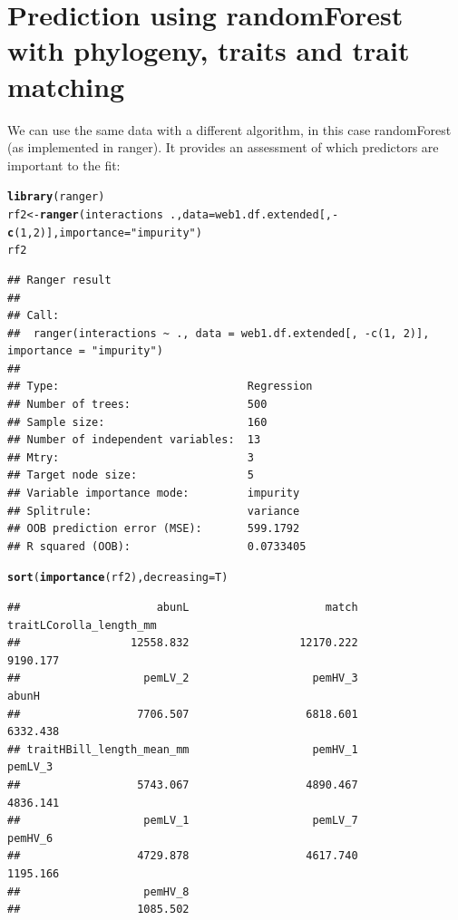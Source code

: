 \documentclass[a4paper, 11pt]{article}\usepackage[]{graphicx}\usepackage[]{color}
\makeatletter
\newcommand{\hlnum}[1]{\textcolor[rgb]{0.686,0.059,0.569}{#1}}%
\newcommand{\hlstr}[1]{\textcolor[rgb]{0.192,0.494,0.8}{#1}}%
\newcommand{\hlopt}[1]{\textcolor[rgb]{0,0,0}{#1}}%
\newcommand{\hlstd}[1]{\textcolor[rgb]{0.345,0.345,0.345}{#1}}%
\newcommand{\hlkwb}[1]{\textcolor[rgb]{0.69,0.353,0.396}{#1}}%
\newcommand{\hlkwc}[1]{\textcolor[rgb]{0.333,0.667,0.333}{#1}}%
\newcommand{\hlkwd}[1]{\textcolor[rgb]{0.737,0.353,0.396}{\textbf{#1}}}%
\newenvironment{kframe}{%
 \def\at@end@of@kframe{}%
 \ifinner\ifhmode%
  \def\at@end@of@kframe{\end{minipage}}%
  \begin{minipage}{\columnwidth}%
 \fi\fi%
 \def\FrameCommand##1{\hskip\@totalleftmargin \hskip-\fboxsep
 \colorbox{shadecolor}{##1}\hskip-\fboxsep
     \hskip-\linewidth \hskip-\@totalleftmargin \hskip\columnwidth}%
 \MakeFramed {\advance\hsize-\width
   \@totalleftmargin\z@ \linewidth\hsize
   \@setminipage}}%
 {\par\unskip\endMakeFramed%
 \at@end@of@kframe}
\newenvironment{knitrout}{}{} %
\makeatother
\begin{document}
\section{Prediction using randomForest with phylogeny, traits and trait matching}
We can use the same data with a different algorithm, in this case randomForest (as implemented in ranger). It provides an assessment of which predictors are important to the fit:
\begin{knitrout}\small
{}\color{fgcolor}\begin{kframe}
\begin{alltt}
\hlkwd{library}\hlstd{(ranger)}
\hlstd{rf2} \hlkwb{<-} \hlkwd{ranger}\hlstd{(interactions} \hlopt{~} \hlstd{.,} \hlkwc{data}\hlstd{=web1.df.extended[,} \hlopt{-}\hlkwd{c}\hlstd{(}\hlnum{1}\hlstd{,} \hlnum{2}\hlstd{)],} \hlkwc{importance}\hlstd{=}\hlstr{"impurity"}\hlstd{)}
\hlstd{rf2}
\end{alltt}
\begin{verbatim}
## Ranger result
## 
## Call:
##  ranger(interactions ~ ., data = web1.df.extended[, -c(1, 2)],      importance = "impurity") 
## 
## Type:                             Regression 
## Number of trees:                  500 
## Sample size:                      160 
## Number of independent variables:  13 
## Mtry:                             3 
## Target node size:                 5 
## Variable importance mode:         impurity 
## Splitrule:                        variance 
## OOB prediction error (MSE):       599.1792 
## R squared (OOB):                  0.0733405
\end{verbatim}
\begin{alltt}
\hlkwd{sort}\hlstd{(}\hlkwd{importance}\hlstd{(rf2),} \hlkwc{decreasing}\hlstd{=T)}
\end{alltt}
\begin{verbatim}
##                     abunL                     match   traitLCorolla_length_mm 
##                 12558.832                 12170.222                  9190.177 
##                   pemLV_2                   pemHV_3                     abunH 
##                  7706.507                  6818.601                  6332.438 
## traitHBill_length_mean_mm                   pemHV_1                   pemLV_3 
##                  5743.067                  4890.467                  4836.141 
##                   pemLV_1                   pemLV_7                   pemHV_6 
##                  4729.878                  4617.740                  1195.166 
##                   pemHV_8 
##                  1085.502
\end{verbatim}
\end{kframe}
\end{knitrout}
\end{document}
